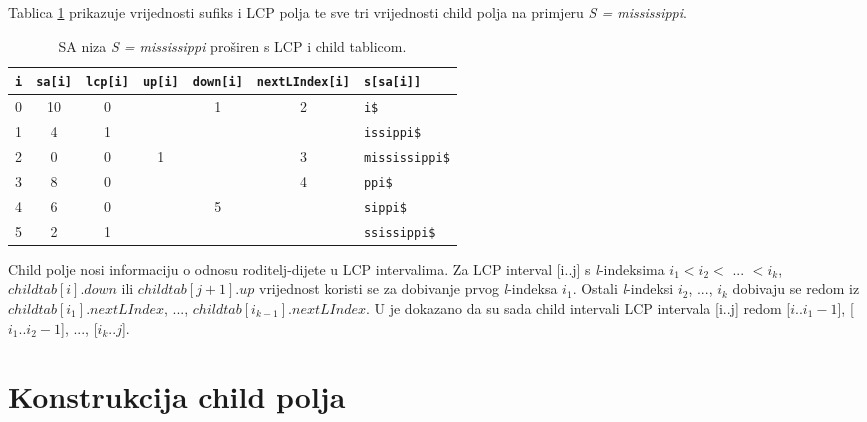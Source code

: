 \documentclass[times, utf8, seminar, numeric]{fer}
\begin{document}
Tablica \ref{tbl:example} prikazuje vrijednosti sufiks i LCP polja te sve tri vrijednosti child polja na primjeru \textit{S = mississippi}.

\begin{table}[h]
	\centering
	\caption{SA  niza \textit{S = mississippi} proširen s LCP i child tablicom.}
	\label{tbl:example}
	
	\begin{tabular}{ccccccl}
		\hline
    \texttt{i} & \texttt{sa[i]} & \texttt{lcp[i]} & \texttt{up[i]} & \texttt{down[i]} & \texttt{nextLIndex[i]} & \texttt{s[sa[i]]} \\ \hline
    0 & 10 &  0 &    &  1 &  2 & \texttt{i\$}           \\
    1 &  4 &  1 &    &    &    & \texttt{issippi\$}     \\
    2 &  0 &  0 &  1 &    &  3 & \texttt{mississippi\$} \\
    3 &  8 &  0 &    &    &  4 & \texttt{ppi\$}         \\
    4 &  6 &  0 &    &  5 &    & \texttt{sippi\$}       \\
    5 &  2 &  1 &    &    &    & \texttt{ssissippi\$}   \\ \hline
	\end{tabular}
\end{table}


Child polje nosi informaciju o odnosu roditelj-dijete u LCP intervalima. Za LCP interval [i..j] s \textit{l}-indeksima $i_1 < i _2 <$ ... $< i_k$, $childtab[i].down$ ili $childtab[j+1].up$ vrijednost koristi se za dobivanje prvog \textit{l}-indeksa $i_1$. Ostali \textit{l}-indeksi $i _2$, ..., $i_k$ dobivaju se redom iz $childtab[i_1].nextLIndex$, ..., $childtab[i_{k-1}].nextLIndex$. U \cite{esa} je dokazano da su sada child intervali LCP intervala [i..j] redom [$i..i_1-1$], [$i_1..i_2-1$], ..., [$i_k..j$].

\chapter{Konstrukcija child polja}
\end{document}
